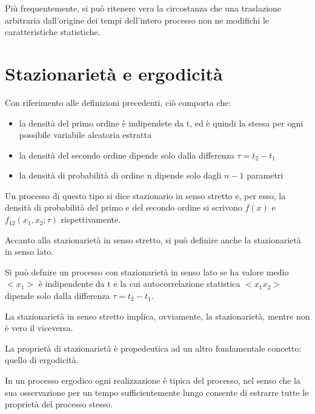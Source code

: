 Più frequentemente, si può ritenere vera la circostanza che una traslazione arbitraria dall'origine dei tempi dell'intero 
processo non ne modifichi le caratteristiche statistiche. \newline 


\newpage 
\section{Stazionarietà e ergodicità}
Con riferimento alle definizioni precedenti, ciò comporta che: 

\begin{itemize}
    \item la densità del primo ordine è indipendete da t, ed è quindi la stessa per ogni possibile variabile aleatoria estratta 
    \item la densità del secondo ordine dipende solo dalla differenza $\tau = t_2 - t_1$
    \item la densità di probabilità di ordine n dipende solo dagli $n-1$ parametri
\end{itemize}

Un processo di questo tipo si dice stazionario in senso stretto e, per esso, la densità di probabilità del 
primo e del secondo ordine si scrivono $f(x)$ e $f_{12} (x_1, x_2; \tau)$ rispettivamente. \newline 

Accanto alla stazionarietà in senso stretto, si può definire anche la stazionarietà in senso lato. \newline 

Si può defnire un processo con stazionarietà in senso lato se ha valore medio $<x_1>$ è indipendente da t e la cui 
autocorrelazione statistica $<x_1 x_2>$ dipende solo dalla differenza $\tau = t_2 - t_1$. \newline 

La stazionarietà in senso stretto implica, ovviamente, la stazionarietà, mentre non è vero il viceversa. \newline 

La proprietà di stazionarietà è propedeutica ad un altro fondamentale concetto: quello di ergodicità. \newline 

In un processo ergodico ogni realizzazione è tipica del processo, nel senso che la sua osservazione per un tempo sufficientemente lungo consente di estrarre tutte le 
proprietà del processo stesso. \newline 

